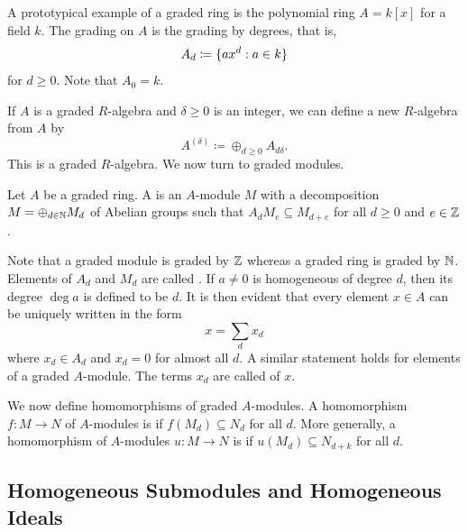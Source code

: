 \begin{example}
	A prototypical example of a graded ring is the polynomial ring $A = k[x]$ for a field $k$. The grading on $A$ is the grading by degrees, that is,
	\begin{equation*}
		A_d \coloneqq \lbrace ax^d : a \in k\rbrace
	\end{equation*}
	for $d \geq 0$. Note that $A_0 = k$.
\end{example}

If $A$ is a graded $R$-algebra and $\delta \geq 0$ is an integer, we can define a new $R$-algebra from $A$ by
\begin{equation*}
	A^{(\delta)} \coloneqq \oplus_{d \geq 0} A_{d \delta}.
\end{equation*}
This is a graded $R$-algebra. We now turn to graded modules.

\begin{definition}
	Let $A$ be a graded ring. A  is an $A$-module $M$ with a decomposition $M = \oplus_{d \in \mathbb N} M_d$ of Abelian groups such that $A_d M_e \subseteq M_{d + e}$ for all $d \geq 0$ and $e \in \mathbb Z$.
\end{definition}

Note that a graded module is graded by $\mathbb Z$ whereas a graded ring is graded by $\mathbb N$. Elements of $A_d$ and $M_d$ are called . If $a \neq 0$ is homogeneous of degree $d$, then its degree $\deg a$ is defined to be $d$. It is then evident that every element $x \in A$ can be uniquely written in the form
\begin{equation*}
	x = \sum_{d} x_d
\end{equation*}
where $x_d \in A_d$ and $x_d = 0$ for almost all $d$. A similar statement holds for elements of a graded $A$-module. The terms $x_d$ are called  of $x$.

We now define homomorphisms of graded $A$-modules. A homomorphism $f \colon M \to N$ of $A$-modules is  if $f(M_d) \subseteq N_d$ for all $d$. More generally, a homomorphism of $A$-modules $u \colon M \to N$ is  if $u(M_{d}) \subseteq N_{d + k}$ for all $d$.

\subsection*{Homogeneous Submodules and Homogeneous Ideals}

